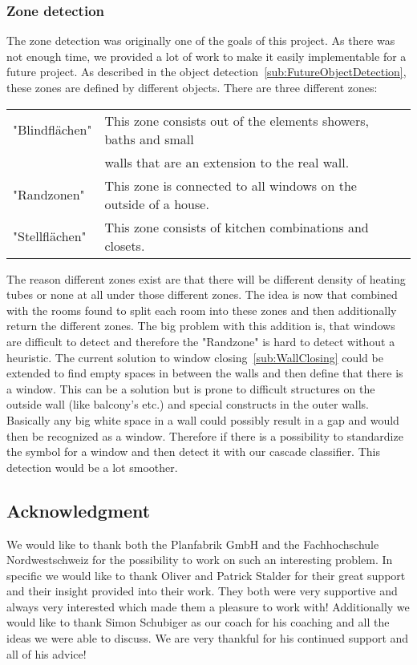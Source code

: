 \subsubsection{Zone detection}
\label{sub:ZoneDetection}
The zone detection was originally one of the goals of this project. As there was not enough time, we provided a lot of work to make it easily implementable for a future project. As described in the object detection~\ref{sub:FutureObjectDetection}, these zones are defined by different objects.
There are three different zones:
\begin{table}[h]
	\centering
	\label{tab:Zones}
	\begin{tabular}{@{}lll@{}}
		"Blindflächen" & This zone consists out of the elements showers, baths and small \\
		& walls that are an extension to the real wall.\\
		"Randzonen" &  This zone is connected to all windows on the outside of a house. \\
		"Stellflächen" & This zone consists of kitchen combinations and closets.\\
	\end{tabular}
\end{table}	

The reason different zones exist are that there will be different density of heating tubes or none at all under those different zones. The idea is now that combined with the rooms found to split each room into these zones and then additionally return the different zones. The big problem with this addition is, that windows are difficult to detect and therefore the "Randzone" is hard to detect without a heuristic. The current solution to window closing~\ref{sub:WallClosing} could be extended to find empty spaces in between the walls and then define that there is a window. This can be a solution but is prone to difficult structures on the outside wall (like balcony's etc.) and special constructs in the outer walls. Basically any big white space in a wall could possibly result in a gap and would then be recognized as a window. Therefore if there is a possibility to standardize the symbol for a window and then detect it with our cascade classifier. This detection would be a lot smoother.

\subsection{Acknowledgment}
We would like to thank both the Planfabrik GmbH and the Fachhochschule Nordwestschweiz for the possibility to work on such an interesting problem. In specific we would like to thank Oliver and Patrick Stalder for their great support and their insight provided into their work. They both were very supportive and always very interested which made them a pleasure to work with! Additionally we would like to thank Simon Schubiger as our coach for his coaching and all the ideas we were able to discuss. We are very thankful for his continued support and all of his advice!
